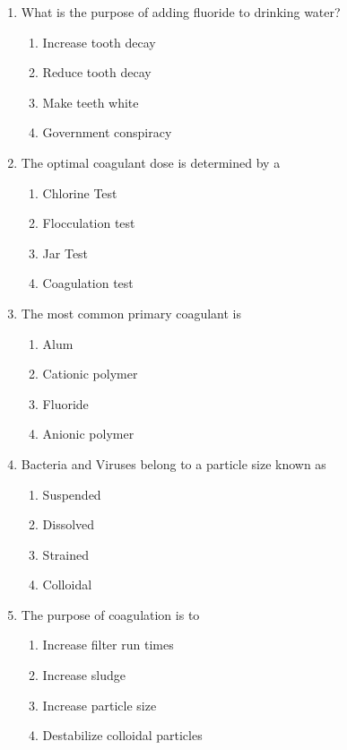 \documentclass{article}
\begin{document}
\begin{enumerate}
\item What is the purpose of adding fluoride to drinking water?
\begin{enumerate}
\item Increase tooth decay
\item Reduce tooth decay
\item Make teeth white
\item Government conspiracy
\end{enumerate}

\item The optimal coagulant dose is determined by a\\
\begin{enumerate}
\item Chlorine Test\\
\item Flocculation test\\
\item Jar Test\\
\item Coagulation test
\end{enumerate}

\item  The most common primary coagulant is\\
\begin{enumerate}
\item Alum\\
\item Cationic polymer\\
\item Fluoride\\
\item Anionic polymer
\end{enumerate}

\item  Bacteria and Viruses belong to a particle size known as\\
\begin{enumerate}
\item Suspended\\
\item Dissolved\\
\item Strained\\
\item Colloidal
\end{enumerate}

\item  The purpose of coagulation is to\\
\begin{enumerate}
\item Increase filter run times\\
\item Increase sludge\\
\item Increase particle size\\
\item Destabilize colloidal particles
\end{enumerate}


\end{enumerate}
\end{document}

